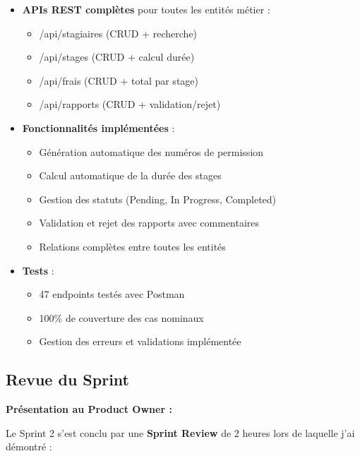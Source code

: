 \documentclass[12pt,a4paper]{report}
\begin{document}
\begin{itemize}[leftmargin=1cm]
    \item \textbf{APIs REST complètes} pour toutes les entités métier :
    \begin{itemize}
        \item /api/stagiaires (CRUD + recherche)
        \item /api/stages (CRUD + calcul durée)
        \item /api/frais (CRUD + total par stage)
        \item /api/rapports (CRUD + validation/rejet)
    \end{itemize}
    
    \item \textbf{Fonctionnalités implémentées} :
    \begin{itemize}
        \item Génération automatique des numéros de permission
        \item Calcul automatique de la durée des stages
        \item Gestion des statuts (Pending, In Progress, Completed)
        \item Validation et rejet des rapports avec commentaires
        \item Relations complètes entre toutes les entités
    \end{itemize}
    
    \item \textbf{Tests} :
    \begin{itemize}
        \item 47 endpoints testés avec Postman
        \item 100\% de couverture des cas nominaux
        \item Gestion des erreurs et validations implémentée
    \end{itemize}
\end{itemize}

\subsection{Revue du Sprint}

\textbf{Présentation au Product Owner :}

Le Sprint 2 s'est conclu par une \textbf{Sprint Review} de 2 heures lors de laquelle j'ai démontré :
\end{document}

